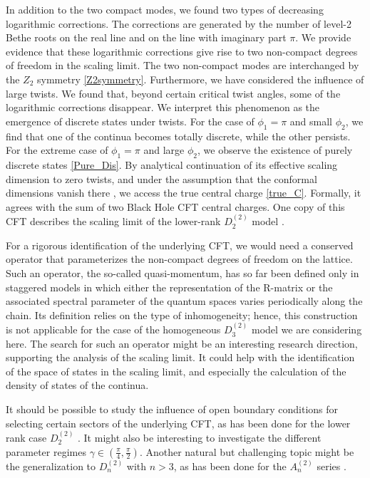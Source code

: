 \documentclass[12pt]{article}
\numberwithin{equation}{section}
\begin{document}
In addition to the two compact modes, we found two types of decreasing logarithmic corrections. The corrections are generated by the number of level-2 Bethe roots on the real line and on the line with imaginary part $\pi$.  We provide evidence that these logarithmic corrections give rise to two non-compact degrees of freedom in the scaling limit. The two non-compact modes are interchanged by the $Z_2$ symmetry \eqref{Z2symmetry}. Furthermore, we have considered the influence of large twists. We found that, beyond certain critical twist angles, some of the logarithmic corrections disappear. We interpret this phenomenon as the emergence of discrete states under twists. For the case of $\phi_1=\pi$ and small $\phi_2$, we find that one of the continua becomes totally discrete, while the other persists.  For the extreme case of $\phi_1=\pi$ and large $\phi_2$, we observe the existence of purely discrete states \eqref{Pure_Dis}. By analytical continuation of its effective scaling dimension to zero twists, and under the assumption that the conformal dimensions vanish there \cite{VeJS14,FrHo17}, we access the true central charge \eqref{true_C}. Formally, it agrees with the sum of two Black Hole CFT central charges. One copy of this CFT describes the scaling limit of the lower-rank $D^{(2)}_2$ model \cite{NeRe21a,IkJS12,BKKL21a}. 

 For a rigorous identification of the underlying CFT, we would need a conserved operator that parameterizes the non-compact degrees of freedom on the lattice.  Such an operator, the so-called quasi-momentum, has so far been defined only in staggered models in which either the representation of the R-matrix \cite{FrHo17} or the associated spectral parameter \cite{IkJS12,KoLu23} of the quantum spaces varies periodically along the chain. Its definition relies on the type of inhomogeneity; hence, this construction is not applicable for the case of the homogeneous $D^{(2)}_3$ model we are considering here. The search for such an operator might be an interesting research direction, supporting the analysis of the scaling limit. It could help with the identification of the space of states in the scaling limit, and especially the calculation of the density of states of the continua. 
 
It should be possible to study the influence of open boundary conditions for selecting certain sectors of the underlying CFT, as has been done for the lower rank case $D^{(2)}_2$ \cite{NePR19,RJS19,RPJS20,NeRe21a,RoJS21,FrGe22,FrGe23}. It might also be interesting to investigate the different parameter regimes $\gamma\in (\frac{\pi}{4},\frac{\pi}{2})$. Another natural but challenging topic might be the generalization to $D^{(2)}_n$ with $n>3$, as has been done for the $A^{(2)}_n$ series \cite{VeJS16a}. 
\end{document}
